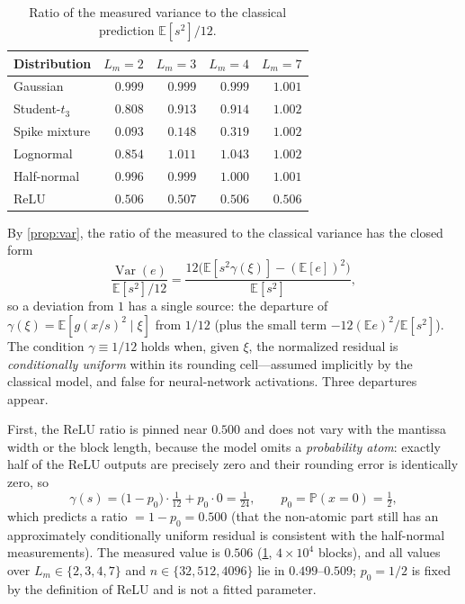 \documentclass[twocolumn,review,hidelinks,oneeqnum,onetabnum,onefignum,onethmnum]{siamart251216}
\begin{document}
\begin{table}[!tb]
\centering
\caption{Ratio of the measured variance to the classical prediction
$\mathbb{E}[s^2]/12$.}
\label{tab:var}
\small
\begin{tabular}{@{}lrrrr@{}}
\toprule
Distribution & $L_m=2$ & $L_m=3$ & $L_m=4$ & $L_m=7$ \\
\midrule
Gaussian           & $0.999$ & $0.999$ & $0.999$ & $1.001$ \\
Student-$t_3$      & $0.808$ & $0.913$ & $0.914$ & $1.002$ \\
Spike mixture      & $\mathbf{0.093}$ & $\mathbf{0.148}$ & $\mathbf{0.319}$ & $1.002$ \\
Lognormal          & $0.854$ & $1.011$ & $1.043$ & $1.002$ \\
Half-normal        & $0.996$ & $0.999$ & $1.000$ & $1.001$ \\
ReLU               & $\mathbf{0.506}$ & $\mathbf{0.507}$ & $\mathbf{0.506}$ & $\mathbf{0.506}$ \\
\bottomrule
\end{tabular}
\end{table}

By \cref{prop:var}, the ratio of the measured to the classical variance has the
closed form
\begin{equation}
\frac{\operatorname{Var}(e)}{\mathbb{E}[s^2]/12}
=\frac{12\bigl(\mathbb{E}[s^2\gamma(\xi)]-(\mathbb{E}[e])^2\bigr)}{\mathbb{E}[s^2]} ,
\label{eq:ratio}
\end{equation}
so a deviation from $1$ has a single source: the departure of
$\gamma(\xi)=\mathbb{E}[g(x/s)^2\mid\xi]$ from $1/12$ (plus the small term
$-12(\mathbb{E}e)^2/\mathbb{E}[s^2]$). The condition $\gamma\equiv1/12$ holds
when, given $\xi$, the normalized residual is \emph{conditionally uniform}
within its rounding cell---assumed implicitly by the classical model, and false
for neural-network activations. Three departures appear.

First, the ReLU ratio is pinned near $0.500$ and does not vary with the mantissa
width or the block length, because the model omits a \emph{probability atom}:
exactly half of the ReLU outputs are precisely zero and their rounding error is
identically zero, so
\begin{equation}
\gamma(s)=\bigl(1-p_0\bigr)\cdot\tfrac1{12}+p_0\cdot 0=\tfrac1{24},
\qquad p_0=\mathbb{P}(x=0)=\tfrac12 ,
\label{eq:atom}
\end{equation}
which predicts a ratio $=1-p_0=0.500$ (that the non-atomic part still has an
approximately conditionally uniform residual is consistent with the half-normal
measurements). The measured value is $0.506$ (\cref{tab:var},
$4\times10^4$ blocks), and all values over $L_m\in\{2,3,4,7\}$ and
$n\in\{32,512,4096\}$ lie in $0.499$--$0.509$; $p_0=1/2$ is fixed by the
definition of ReLU and is not a fitted parameter.
\end{document}
